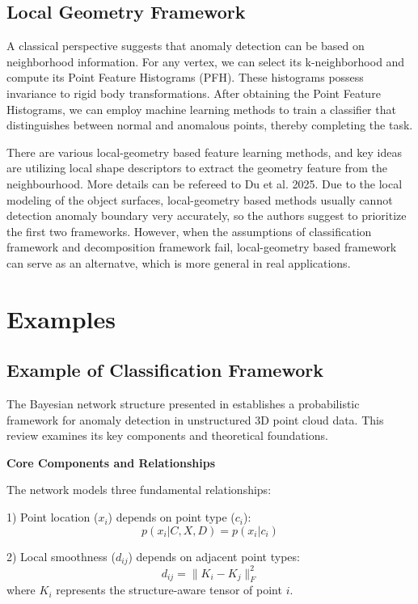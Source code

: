\subsection{Local Geometry Framework}
A classical perspective suggests that anomaly detection can be based on neighborhood information. For any vertex, we can select its k-neighborhood and compute its Point Feature Histograms (PFH). These histograms possess invariance to rigid body transformations. After obtaining the Point Feature Histograms, we can employ machine learning methods to train a classifier that distinguishes between normal and anomalous points, thereby completing the task. 

There are various local-geometry based feature learning methods\cite{Du202X}, and key ideas are utilizing local shape descriptors to extract the geometry feature from the neighbourhood. More details can be refereed to  Du et al. 2025. Due to the local modeling of the object surfaces, local-geometry based methods usually cannot detection anomaly boundary very accurately, so the authors suggest to prioritize the first two frameworks. However, when the assumptions of classification framework and decomposition framework fail, local-geometry based framework  can serve as an alternatve, which is more general in real applications.


\section{Examples}
\subsection{Example of Classification Framework}

The Bayesian network structure presented in \cite{tao2023anomaly} establishes a probabilistic framework for anomaly detection in unstructured 3D point cloud data. This review examines its key components and theoretical foundations.

\textbf{Core Components and Relationships}

The network models three fundamental relationships:

1) Point location ($x_i$) depends on point type ($c_i$):
\begin{equation}
p(x_i | C, X, D) = p(x_i | c_i)
\end{equation}

2) Local smoothness ($d_{ij}$) depends on adjacent point types:
\begin{equation}
d_{ij} = \|K_i-K_j\|_F^2
\end{equation}
where $K_i$ represents the structure-aware tensor of point $i$.

